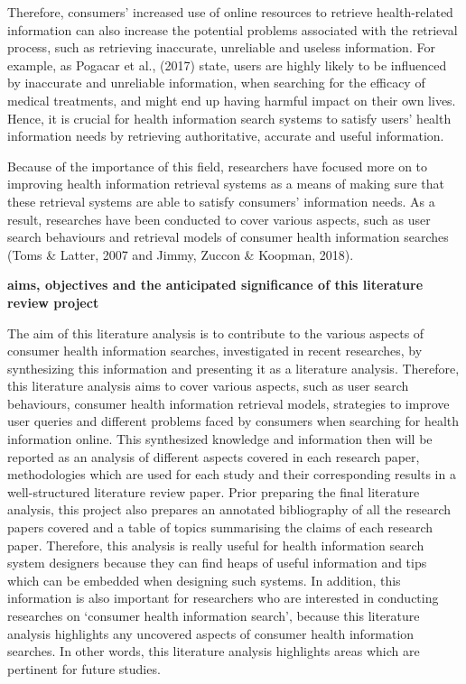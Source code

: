\documentclass[]{article}
\begin{document}
Therefore, consumers’ increased use of online resources to retrieve health-related information can also increase the potential problems associated with the retrieval process, such as retrieving inaccurate, unreliable and useless information. For example, as Pogacar et al., (2017) state, users are highly likely to be influenced by inaccurate and unreliable information, when searching for the efficacy of medical treatments, and might end up having harmful impact on their own lives. Hence, it is crucial for health information search systems to satisfy users’ health information needs by retrieving authoritative, accurate and useful information.  
   
Because of the importance of this field, researchers have focused more on to improving health information retrieval systems as a means of making sure that these retrieval systems are able to satisfy consumers’ information needs. As a result, researches have been conducted to cover various aspects, such as user search behaviours and retrieval models of consumer health information searches (Toms \& Latter, 2007 and Jimmy, Zuccon \& Koopman, 2018).    

\textbf{aims, objectives and the anticipated significance of this literature review project}

The aim of this literature analysis is to contribute to the various aspects of consumer health information searches, investigated in recent researches, by synthesizing this information and presenting it as a literature analysis. Therefore, this literature analysis aims to cover various aspects, such as user search behaviours, consumer health information retrieval models, strategies to improve user queries and different problems faced by consumers when searching for health information online. This synthesized knowledge and information then will be reported as an analysis of different aspects covered in each research paper, methodologies which are used for each study and their corresponding results in a well-structured literature review paper. Prior preparing the final literature analysis, this project also prepares an annotated bibliography of all the research papers covered and a table of topics summarising the claims of each research paper. Therefore, this analysis is really useful for health information search system designers because they can find heaps of useful information and tips which can be embedded when designing such systems. In addition, this information is also important for researchers who are interested in conducting researches on ‘consumer health information search’, because this literature analysis highlights any uncovered aspects of consumer health information searches. In other words, this literature analysis highlights areas which are pertinent for future studies.   
    
\end{document}
